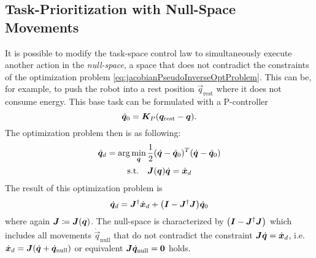 		\subsection{Task-Prioritization with Null-Space Movements}
			It is possible to modify the task-space control law to simultaneously execute another action in the \emph{null-space}, a space that does not contradict the constraints of the optimization problem \eqref{eq:jacobianPseudoInverseOptProblem}. This can be, for example, to push the robot into a rest position \( \vec{q}_\mathrm{rest} \) where it does not consume energy. This base task can be formulated with a P-controller
			\begin{equation*}
				\dot{\bm{q}}_0 = \bm{K}_P (\bm{q}_\mathrm{rest} - \bm{q}).
			\end{equation*}
			The optimization problem then is as following:
			\begin{equation*}
				\begin{aligned}
					\dot{\bm{q}}_d = \arg\min_{\dot{\bm{q}}} \, & \frac{1}{2} (\dot{\bm{q}} - \dot{\bm{q}}_0)^T (\dot{\bm{q}} - \dot{\bm{q}}_0) \\
					\mathrm{s.t.} \quad&
						\begin{aligned}[t]
							\bm{J}(\bm{q}) \dot{\bm{q}} &= \dot{\bm{x}}_d
						\end{aligned}
				\end{aligned}
			\end{equation*}
			The result of this optimization problem is
			\begin{equation*}
				\dot{\bm{q}}_d = \bm{J}^\dagger \dot{\bm{x}}_d + \big( \bm{I} - \bm{J}^\dagger \bm{J} \big) \dot{\bm{q}}_0
			\end{equation*}
			where again \( \bm{J} \coloneqq \bm{J}(\bm{q}) \). The null-space is characterized by \( \big( \bm{I} - \bm{J}^\dagger \bm{J} \big) \) which includes all movements \( \dot{\vec{q}}_\mathrm{null} \) that do not contradict the constraint \( \bm{J} \dot{\bm{q}} = \dot{\bm{x}}_d \), i.e. \( \dot{\bm{x}}_d = \bm{J} (\dot{\bm{q}} + \dot{\bm{q}}_\mathrm{null}) \) or equivalent \( \bm{J} \dot{\bm{q}}_\mathrm{null} = \bm{0} \) holds.

